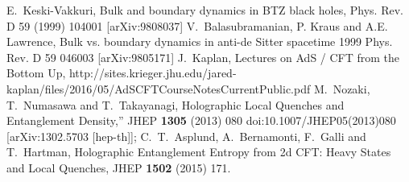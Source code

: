\documentclass[11pt,a4paper]{article}
\begin{document}
\begin{thebibliography}{}
E.~Keski-Vakkuri, Bulk and boundary dynamics in BTZ black holes, Phys. Rev. D 59 (1999) 104001 [arXiv:9808037]
V.~Balasubramanian, P. Kraus and A.E. Lawrence, Bulk vs. boundary dynamics in anti-de Sitter spacetime 1999 Phys. Rev. D 59 046003 [arXiv:9805171]
J.~Kaplan, Lectures on AdS / CFT from the Bottom Up, http://sites.krieger.jhu.edu/jared-kaplan/files/2016/05/AdSCFTCourseNotesCurrentPublic.pdf
M.~Nozaki, T.~Numasawa and T.~Takayanagi, Holographic Local Quenches and Entanglement Density,''  JHEP {\bf 1305} (2013) 080  doi:10.1007/JHEP05(2013)080  [arXiv:1302.5703 [hep-th]];
C.~T.~Asplund, A.~Bernamonti, F.~Galli and T.~Hartman, Holographic Entanglement Entropy from 2d CFT: Heavy States and Local Quenches,  JHEP {\bf 1502} (2015) 171.
    
    
\end{thebibliography}
\end{document}
